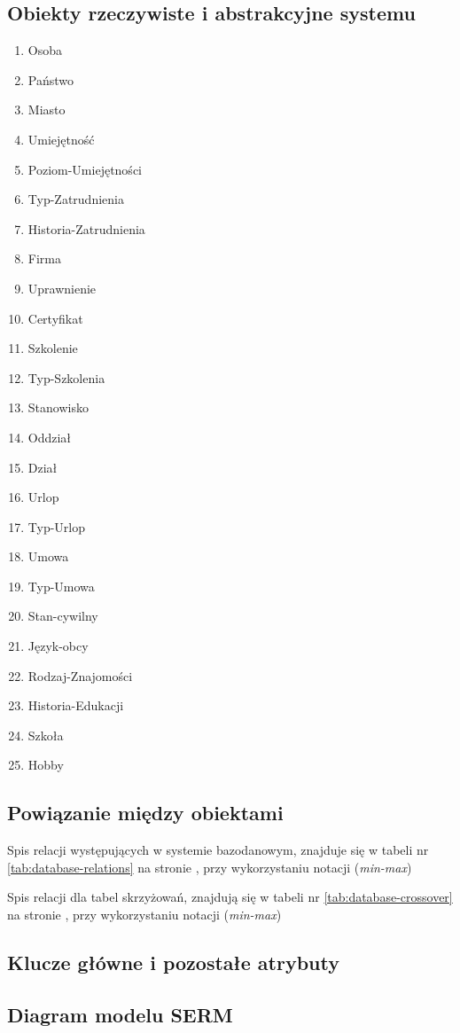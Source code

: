 \documentclass[a4paper]{article}
\begin{document}
\subsection{Obiekty rzeczywiste i abstrakcyjne systemu}
\begin{multicols}{2}
\begin{enumerate}


\item Osoba
\item Państwo
\item Miasto
\item Umiejętność
\item Poziom-Umiejętności
\item Typ-Zatrudnienia
\item Historia-Zatrudnienia
\item Firma
\item Uprawnienie
\item Certyfikat
\item Szkolenie
\item Typ-Szkolenia
\item Stanowisko
\item Oddział
\item Dział
\item Urlop
\item Typ-Urlop
\item Umowa
\item Typ-Umowa
\item Stan-cywilny
\item Język-obcy
\item Rodzaj-Znajomości
\item Historia-Edukacji
\item Szkoła
\item Hobby
\end{enumerate}
\end{multicols}
\subsection{Powiązanie między obiektami}
Spis relacji występujących w systemie bazodanowym, znajduje się w tabeli nr \ref{tab:database-relations} na stronie \pageref{tab:database-relations}, przy wykorzystaniu notacji (\emph{min-max})



Spis relacji dla tabel skrzyżowań, znajdują się w tabeli nr \ref{tab:database-crossover} na stronie \pageref{tab:database-crossover}, przy wykorzystaniu notacji (\emph{min-max})



\subsection{Klucze główne i pozostałe atrybuty}


\subsection{Diagram modelu SERM}
\end{document}
